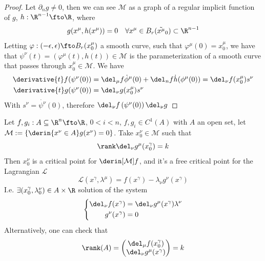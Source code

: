 \documentclass[../mmf.tex]{subfiles}
\begin{document}
\begin{proof}
	Let $\partial_ng\ne0$, then we can see $\mathcal{M}$ as a graph of a regular implicit function of $g$, $h:\R^{n-1}\fto\R$, where
	\begin{equation*}
		g(x^\mu,h(x^\mu))=0\quad\forall x^\mu\in B_r(\tilde{x^\mu}_0)\subset\R^{n-1}
	\end{equation*}
	Letting $\varphi:(-\epsilon,\epsilon)\fto B_r(x^\mu_0)$ a smooth curve, such that $\varphi^\mu(0)=x^\mu_0$, we have that $\psi^\nu(t)=(\varphi^\mu(t),h(t))\in\mathcal{M}$ is the parameterization of a smooth curve that passes through $x^\mu_0\in\mathcal{M}$. We have
	\begin{equation*}
		\begin{aligned}
			\derivative{t}f(\psi^\nu(0))&=\del_\mu f\dot{\phi}^\mu(0)+\del_nf\dot{h}(\phi^\mu(0))=\del_\nu f(x^\mu_0)s^\nu\\
			\derivative{t}g(\psi^\nu(0))&=\del_\nu g(x^\mu_0)s^\nu
		\end{aligned}
	\end{equation*}
	With $s^\nu=\dot{\psi^\nu}(0)$, therefore $\del_\nu f\left(\psi^\nu(0)\right)\del_\nu g$
\end{proof}
\begin{thm}
	Let $f,g_i:A\subseteq\R^n\fto\R$, $0<i<n$, $f,g_i\in C^1(A)$ with $A$ an open set, let $\mathcal{M}:=\{\derin{x^\nu\in A}g(x^\nu)=0\}$. Take $x^\nu_0\in\mathcal{M}$ such that
	\begin{equation*}
		\rank\del_\nu g^\mu(x^\gamma_0)=k
	\end{equation*}
	Then $x^\nu_0$ is a critical point for $\derin[\mathcal{M}]{f}$, and it's a free critical point for the Lagrangian $\mathcal{L}$
	\begin{equation*}
		\mathcal{L}(x^\gamma,\lambda^\mu)=f(x^\gamma)-\lambda_\nu g^\nu(x^\gamma)
	\end{equation*}
	I.e. $\exists(x^\gamma_0,\lambda^\nu_0)\in A\times\R$ solution of the system
	\begin{equation*}
		\left\{ \begin{aligned}
				\del_\nu f(x^\gamma)&=\del_\nu g^\mu(x^\gamma)\lambda^\nu\\
				g^\nu(x^\gamma)&=0
		\end{aligned}\right.
	\end{equation*}
	Alternatively, one can check that
	\begin{equation*}
		\rank(A)=\begin{pmatrix}\del_\mu f(x^\gamma_0)\\\del_\nu g^\mu(x^\gamma)\end{pmatrix}=k
	\end{equation*}
\end{thm}
\end{document}
